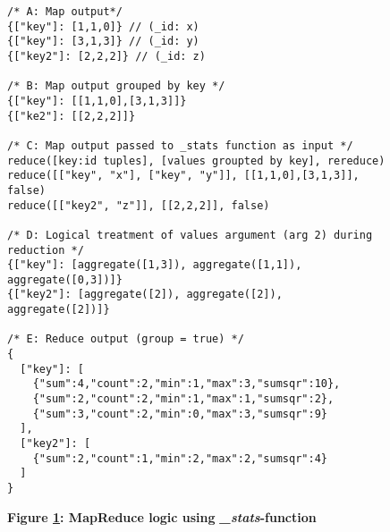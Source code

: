 \begin{figure}[H]
  \centering
  \begin{mdframed}[rightline=true,leftline=true]
    \begin{verbatim}
/* A: Map output*/
{["key"]: [1,1,0]} // (_id: x)
{["key"]: [3,1,3]} // (_id: y)
{["key2"]: [2,2,2]} // (_id: z)

/* B: Map output grouped by key */
{["key"]: [[1,1,0],[3,1,3]]}
{["ke2"]: [[2,2,2]]}

/* C: Map output passed to _stats function as input */
reduce([key:id tuples], [values groupted by key], rereduce)
reduce([["key", "x"], ["key", "y"]], [[1,1,0],[3,1,3]], false)
reduce([["key2", "z"]], [[2,2,2]], false)

/* D: Logical treatment of values argument (arg 2) during reduction */
{["key"]: [aggregate([1,3]), aggregate([1,1]),  aggregate([0,3])]}
{["key2"]: [aggregate([2]), aggregate([2]),  aggregate([2])]}

/* E: Reduce output (group = true) */
{
  ["key"]: [
    {"sum":4,"count":2,"min":1,"max":3,"sumsqr":10},
    {"sum":2,"count":2,"min":1,"max":1,"sumsqr":2},
    {"sum":3,"count":2,"min":0,"max":3,"sumsqr":9}
  ],
  ["key2"]: [
    {"sum":2,"count":1,"min":2,"max":2,"sumsqr":4}
  ]
}
    \end{verbatim}
  \end{mdframed}
  \caption[MapReduce logic using \textit{\_stats}-function]{\textbf{Figure \ref{fig-stats-reduce-fn}: MapReduce logic using \textit{\_stats}-function}}
  \label{fig-stats-reduce-fn}
\end{figure}